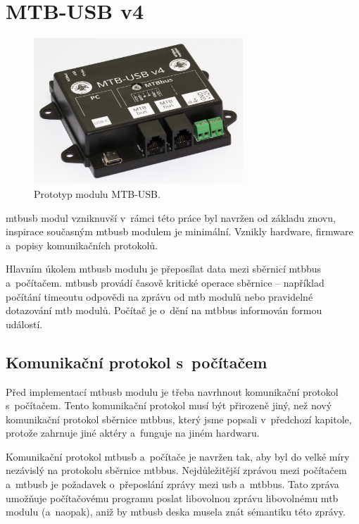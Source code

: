 \section{MTB-USB v4}

\begin{figure}[ht]
\includegraphics[width=0.7\textwidth]{data/usb-all.jpg}
\caption{Prototyp modulu MTB-USB.}
\label{fig:mtbusb-prototype}
\end{figure}

\gls{mtbusb} modul vzniknuvší v~rámci této práce byl navržen od základu znovu,
inspirace současným \gls{mtbusb} modulem je minimální. Vznikly hardware,
firmware a~popisy komunikačních protokolů.

Hlavním úkolem \gls{mtbusb} modulu je přeposílat data mezi sběrnicí \gls{mtbbus}
a~počítačem. \gls{mtbusb} provádí časově kritické operace sběrnice – například
počítání timeoutu odpovědi na zprávu od \gls{mtb} modulů nebo pravidelné
dotazování \gls{mtb} modulů. Počítač je o~dění na \gls{mtbbus} informován
formou událostí.

\subsection{Komunikační protokol s~počítačem}

Před implementací \gls{mtbusb} modulu je třeba navrhnout komunikační protokol
s~počítačem. Tento komunikační protokol musí být přirozeně jiný, než nový
komunikační protokol sběrnice \gls{mtbbus}, který jsme popsali v~předchozí
kapitole, protože zahrnuje jiné aktéry a~funguje na jiném hardwaru.

Komunikační protokol \gls{mtbusb} a~počítače je navržen tak, aby byl do velké
míry nezávislý na protokolu sběrnice \gls{mtbbus}. Nejdůležitější zprávou mezi
počítačem a~\gls{mtbusb} je požadavek o~přeposlání zprávy mezi \gls{usb}
a~\gls{mtbbus}. Tato zpráva umožňuje počítačovému programu poslat libovolnou
zprávu libovolnému \gls{mtb} modulu (a~naopak), aniž by \gls{mtbusb} deska
musela znát sémantiku této zprávy.

